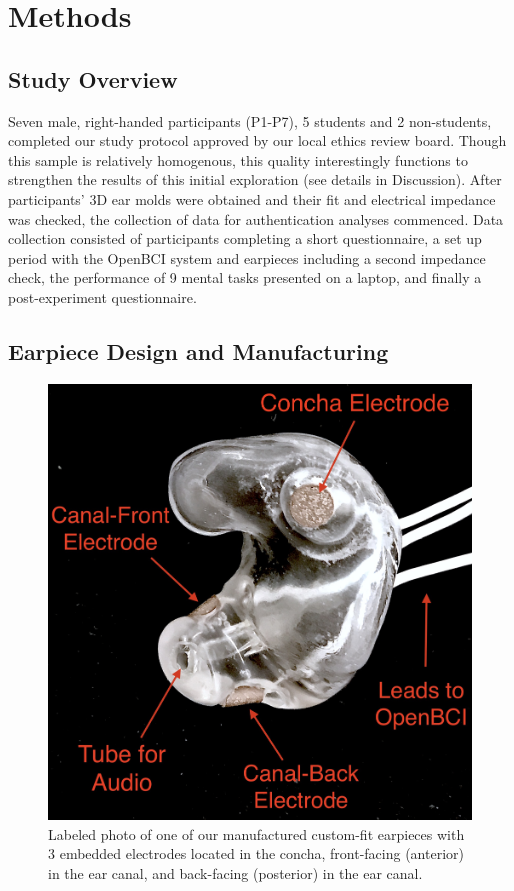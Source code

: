 \documentclass{sigchi}
\begin{document}
\section{Methods}

\subsection{Study Overview}

Seven male, right-handed participants (P1-P7), 5 students and 2 non-students, completed our study protocol approved by our local ethics review board. Though this sample is relatively homogenous, this quality interestingly functions to strengthen the results of this initial exploration (see details in Discussion). After participants' 3D ear molds were obtained and their fit and electrical impedance was checked, the collection of data for authentication analyses commenced. Data collection consisted of participants completing a short questionnaire, a set up period with the OpenBCI system and earpieces including a second impedance check, the performance of 9 mental tasks presented on a laptop, and finally a post-experiment questionnaire.

\subsection{Earpiece Design and Manufacturing}

\begin{figure}[htbp]
\centering
\includegraphics[width=.75\linewidth]{./figures/CFEEEG_piecefig_Right.jpg}
\caption{Labeled photo of one of our manufactured custom-fit earpieces with 3 embedded electrodes located in the concha, front-facing (anterior) in the ear canal, and back-facing (posterior) in the ear canal.}
\label{fig:earpiece_diagram}
\end{figure}
\end{document}
